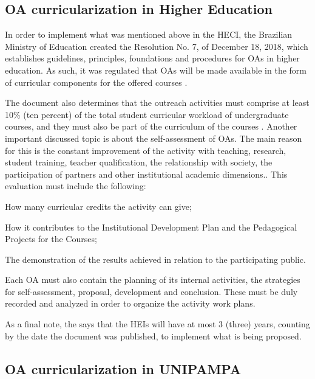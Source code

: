 \subsection{\acl{OA} curricularization in Higher Education}\label{sec:bac-higher-ed}

In order to implement what was mentioned above in the \ac{HECI}, the Brazilian Ministry of Education created the Resolution No. 7, of December 18, 2018, which establishes guidelines, principles, foundations and procedures for \acp{OA} in higher education. As such, it was regulated that \acp{OA} will be made available in the form of curricular components for the offered courses \cite{ministerioSuperiorExtensao}.

The document also determines that the outreach activities must comprise at least 10\% (ten percent) of the total student curricular workload of undergraduate courses, and they must also be part of the curriculum of the courses \cite{ministerioSuperiorExtensao}. Another important discussed topic is about the self-assessment of \acp{OA}. The main reason for this is the constant improvement of the activity with teaching, research, student training, teacher qualification, the relationship with society, the participation of partners and other institutional academic dimensions.. This evaluation must include the following:

\begin{inparaenum}[(a)]
  \item How many curricular credits the activity can give;
  \item How it contributes to the Institutional Development Plan and the Pedagogical Projects for the Courses;
  \item The demonstration of the results achieved in relation to the participating public.
\end{inparaenum}

Each \ac{OA} must also contain the planning of its internal activities, the strategies for self-assessment, proposal, development and conclusion. These must be duly recorded and analyzed in order to organize the activity work plans.

As a final note, the \textcite{ministerioSuperiorExtensao} says that the \acp{HEI} will have at most 3 (three) years, counting by the date the document was published, to implement what is being proposed.

\subsection{\acl{OA} curricularization in \acl{UNIPAMPA}}\label{sec:bac-unipampa}

